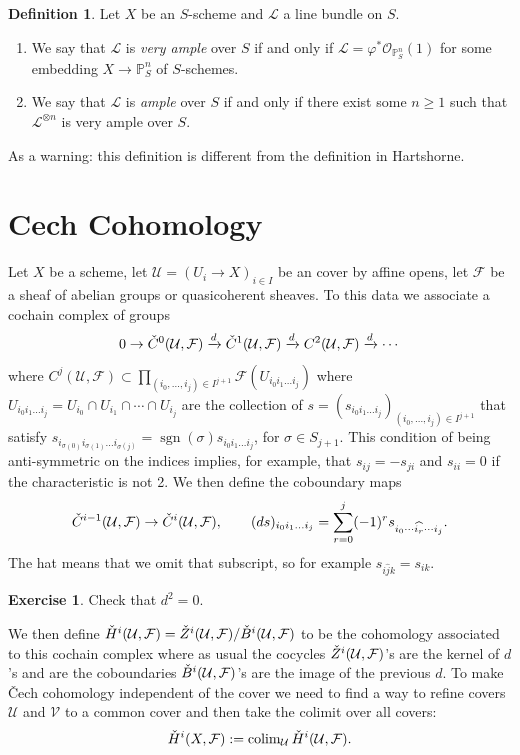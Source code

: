 \documentclass[12pt]{article}
\numberwithin{equation}{section}
\theoremstyle{definition}
\newtheorem{definition}[theorem]{Definition}
\newtheorem{exercise}[theorem]{Exercise}
\theoremstyle{remark}
\newcommand{\Ocal}{\mathcal{O}}
\newcommand{\PP}{\mathbb{P}}
\newcommand{\Lcal}{\mathcal{L}}
\newcommand{\Fcal}{\mathcal{F}}
\newcommand{\Ucal}{\mathcal{U}}
\newcommand{\sgn}{\operatorname{sgn}}
\newcommand{\colim}{\operatorname{colim}}
\newcommand{\Cv}{\Check{C}}
\begin{document}
\begin{definition}
	Let $X$ be an $S$-scheme and $\Lcal$ a line bundle on $S$. 
	\begin{enumerate}
		\item We say that $\Lcal$ is \emph{very ample} over $S$ if and only if $\Lcal = \varphi^*\Ocal_{\PP^n_S}(1)$ for some embedding $X \to \PP^n_S$ of $S$-schemes.  
		\item We say that $\Lcal$ is \emph{ample} over $S$ if and only if there exist some $n\geq 1$ such that $\Lcal^{\otimes n}$ is very ample over $S$.
	\end{enumerate}
\end{definition}

As a warning: this definition is different from the definition in Hartshorne.

\section{Cech Cohomology}
Let $X$ be a scheme, let $\Ucal=(U_i \to X)_{i\in I}$ be an cover by affine opens, let $\Fcal$ be a sheaf of abelian groups or quasicoherent sheaves.
To this data we associate a cochain complex of groups
$$ 0 \to \Cv^0(\Ucal, \Fcal) \xrightarrow{d} \Cv^1(\Ucal,\Fcal) \xrightarrow{d}  C^2(\Ucal,\Fcal) \xrightarrow{d} \cdots $$
where $C^j(\Ucal,\Fcal) \subset \prod_{(i_0,\ldots,i_j) \in I^{j+1}} \Fcal(U_{i_0i_1\ldots i_j})$ where $U_{i_0i_1\ldots i_j} = U_{i_0} \cap U_{i_1} \cap \cdots \cap U_{i_j}$ are the collection of $s=(s_{i_0i_1\ldots i_j})_{(i_0,\ldots,i_j)\in I^{j+1}}$ that satisfy 
$s_{i_{\sigma(0)}i_{\sigma(1)} \ldots i_{\sigma(j)} } = \sgn(\sigma) s_{i_0i_1\ldots i_j}$, for $\sigma \in S_{j+1}.$
This condition of being anti-symmetric on the indices implies, for example, that  $s_{ij}=-s_{ji}$ and $s_{ii}=0$ if the characteristic is not 2. 
We then define the coboundary maps \
$$\Cv^{i-1}(\Ucal,\Fcal) \to \Cv^i(\Ucal,\Fcal),\qquad 
 (ds)_{i_0i_1\ldots i_j} = \sum_{r=0}^j (-1)^r s_{i_0\cdots \widehat{i_r} \cdots  i_j}. $$
The hat means that we omit that subscript, so for example $s_{i\widehat{j}k} =s_{ik}$.
 \begin{exercise}
	Check that $d^2=0$.
\end{exercise}
We then define $\Check{H}^i(\Ucal,\Fcal) =\Check{Z}^i(\Ucal,\Fcal)/\Check{B}^i(\Ucal,\Fcal)$ to be the cohomology associated to this cochain complex where as usual the cocycles $\Check{Z}^i(\Ucal,\Fcal)$'s are the kernel of $d$'s and are the coboundaries $\Check{B}^i(\Ucal,\Fcal)$'s are the image of the previous $d$.
To make \v{C}ech cohomology independent of the cover we need to find a way to refine covers $\mathcal{U}$ and $\mathcal{V}$ to a common cover and then take the colimit over all covers:
 $$ \Check{H}^i(X,\Fcal) := \colim_{\Ucal} \Check{H}^i(\Ucal,\Fcal). $$ 
\end{document}
